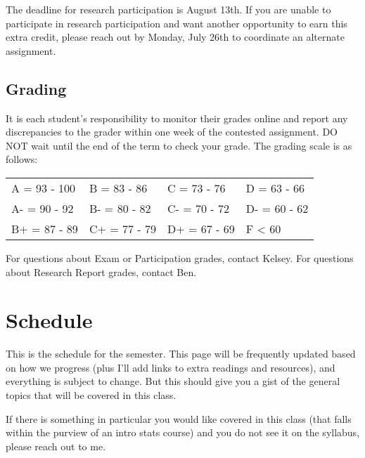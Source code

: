 \documentclass[
]{book}
\begin{document}
The deadline for research participation is August 13th. If you are unable to participate in research participation and want another opportunity to earn this extra credit, please reach out by Monday, July 26th to coordinate an alternate assignment.

\hypertarget{grading}{%
\subsection{Grading}\label{grading}}

It is each student's responsibility to monitor their grades online and report any discrepancies to the grader within one week of the contested assignment. DO NOT wait until the end of the term to check your grade. The grading scale is as follows:

\begin{longtable}[]{@{}llll@{}}
\toprule
\endhead
A = 93 - 100 & B = 83 - 86 & C = 73 - 76 & D = 63 - 66\tabularnewline
A- = 90 - 92 & B- = 80 - 82 & C- = 70 - 72 & D- = 60 - 62\tabularnewline
B+ = 87 - 89 & C+ = 77 - 79 & D+ = 67 - 69 & F \textless{} 60\tabularnewline
\bottomrule
\end{longtable}

For questions about Exam or Participation grades, contact Kelsey. For questions about Research Report grades, contact Ben.

\hypertarget{schedule}{%
\section{Schedule}\label{schedule}}

This is the schedule for the semester. This page will be frequently updated based on how we progress (plus I'll add links to extra readings and resources), and everything is subject to change. But this should give you a gist of the general topics that will be covered in this class.

If there is something in particular you would like covered in this class (that falls within the purview of an intro stats course) and you do not see it on the syllabus, please reach out to me.
\end{document}
